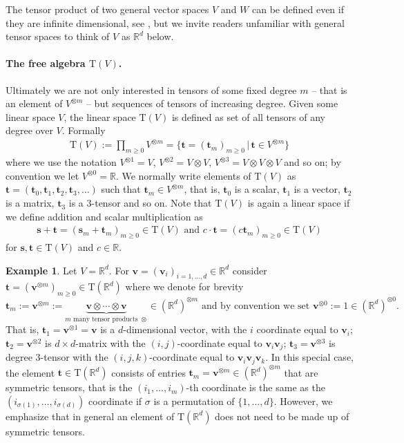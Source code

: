\documentclass{article} \usepackage{iclr2021_conference,times}
\newcommand{\R}{\mathbb{R}}
\newcommand{\bv}{\mathbf{v}}
\newcommand{\T}[1]{\mathrm{T}({#1})}
\newcommand{\bt}{\mathbf{t}}
\newcommand{\bs}{\mathbf{s}}
\theoremstyle{plain}
\theoremstyle{definition}
\newtheorem{example}[thm]{Example}
\begin{document}
	The tensor product of two general vector spaces $ V $ and $ W $ can be defined even if they are infinite dimensional, see \cite[Chapter 16]{Lang}, but we invite readers unfamiliar with general tensor spaces to think of $ V $ as $\R^d$ below.
	
 \paragraph{The free algebra $\T{V}$.}
 Ultimately we are not only interested in tensors of some fixed degree $m$ -- that is an element of $V^{\otimes m}$ -- but sequences of tensors of increasing degree. Given some linear space $ V $, the linear space $ \T{V} $ is defined as set of all tensors of any degree over $ V $.
 Formally
 \begin{align}
   \T{V} := \prod_{m\geq 0} V^{\otimes m} =   \{\bt=(\bt_m)_{m\ge 0}\,\vert\, \bt \in V^{\otimes m}\}\end{align}
 where we use the notation $V^{\otimes 1}=V$, $V^{\otimes 2} = V \otimes V,\, V^{\otimes 3} = V \otimes V \otimes V $ and so on; by convention we let $ V^{\otimes 0} = \R $.
 We normally write elements of $ \T{V} $ as $ \bt = (\bt_0, \bt_1, \bt_2, \bt_3, \ldots ) $ such that $ \bt_m \in V^{\otimes m} $, that is, $\bt_0$ is a scalar, $ \bt_1 $ is a vector, $ \bt_2 $ is a matrix, $ \bt_3 $ is a $ 3 $-tensor and so on.	
 Note that $\T{V}$ is again a linear space if we define addition and scalar multiplication as
 \begin{align}
 \bs + \bt = (\bs_m+\bt_m)_{m \ge 0} \in \T{V}\text{ and } c \cdot \bt = (c\bt_m)_{m \ge 0} \in \T{V}
 \end{align}
 for $\bs,\bt\in \T{V}$ and $c \in \R$.
\begin{example}
    Let $V=\R^d$.
    For $\bv=(\bv_i)_{i=1,\ldots,d} \in \R^d$ consider $\bt=(\bv^{\otimes m})_{m \ge 0} \in \T{\R^d}$ where we denote for brevity
    \[\bt_m:=\bv^{\otimes m}:= \underbrace{\bv \otimes \cdots \otimes \bv}_{m \text{ many tensor products }\otimes} \in (\R^d)^{\otimes m} \text{ and by convention we set }\bv^{\otimes 0 }:=1 \in  (\R^d)^{\otimes 0}.\]
    That is, $\bt_1=\bv^{\otimes 1}=\bv$ is a $d$-dimensional vector, with the $i$ coordinate equal to $\bv_i$; $\bt_2=\bv^{\otimes 2}$ is $d\times d$-matrix with the $(i,j)$-coordinate equal to $\bv_i\bv_j$; $\bt_3=\bv^{\otimes 3}$ is degree $3$-tensor with the $(i,j,k)$-coordinate equal to $\bv_i\bv_j\bv_k$.
    In this special case, the element $\bt\in \T{\R^d}$ consists of entries $\bt_m=\bv^{\otimes m} \in (\R^{d})^{\otimes m}$ that are symmetric tensors, that is the $(i_1,\ldots,i_m)$-th coordinate is the same as the $(i_{\sigma(1)},\ldots,i_{\sigma(d)})$ coordinate if $\sigma$ is a permutation of $\{1,\ldots,d\}$. 
    However, we emphasize that in general an element of $\T{\R^d}$ does not need to be made up of symmetric tensors.
  \end{example}
\end{document}
